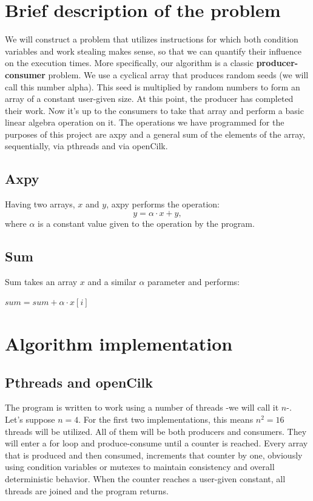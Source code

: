\documentclass[11pt,a4paper,onecolumn,final]{article}
\begin{document}
\section{Brief description of the problem}
We will construct a problem that utilizes instructions for which both condition variables and work stealing makes sense, so that we can quantify their influence on the execution times. More specifically, our algorithm is a classic \textbf{producer-consumer} problem. We use a cyclical array that produces random seeds (we will call this number alpha). This seed is multiplied by random numbers to form an array of a constant user-given size. At this point, the producer has completed their work. Now it’s up to the consumers to take that array and perform a basic linear algebra operation on it. The operations we have programmed for the purposes of this project are axpy and a general sum of the elements of the array, sequentially, via pthreads and via openCilk. 
\subsection{Axpy}
Having two arrays, $x$ and $y$, axpy performs the operation:
\begin{equation}
y=\alpha\cdot x+y,
\end{equation}
where $\alpha$ is a constant value given to the operation by the program.
\subsection{Sum}
Sum takes an array $x$ and a similar $\alpha$ parameter and performs:
\begin{algorithmic}
	\State $sum=sum+\alpha\cdot x[i]$
\EndFor
\end{algorithmic}
\section{Algorithm implementation}
\subsection{Pthreads and openCilk}
The program is written to work using a number of threads -we will call it $n$-. Let’s suppose $n=4$. For the first two implementations, this means $n^{2}=16$ threads will be utilized. All of them will be both producers and consumers. They will enter a for loop and produce-consume until a counter is reached. Every array that is produced and then consumed, increments that counter by one, obviously using condition variables or mutexes to maintain consistency and overall deterministic behavior. When the counter reaches a user-given constant, all threads are joined and the program returns.
\end{document}
